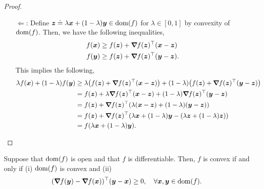 \begin{proof}
\begin{enumerate}
        \item[$\Leftarrow$:] Define $\bm{z} \doteq \lambda \bm{x} + (1-\lambda) \bm{y} \in \mathrm{dom}(f)$ for $\lambda \in[0,1]$ by convexity of $\mathrm{dom}(f)$. Then, we have the following inequalities,
              \begin{align*}
                  f(\bm{x}) & \geq f(\bm{z}) + \bm{\nabla}_{\! } f(\bm{z})^\top (\bm{x}-\bm{z})  \\
                  f(\bm{y}) & \geq f(\bm{z}) + \bm{\nabla}_{\! } f(\bm{z})^\top (\bm{y}-\bm{z}).
              \end{align*}
              This implies the following,
              \begin{align*}
                  \lambda f(\vec{x}) + (1-\lambda) f(\vec{y}) & \geq \lambda \lft( f(\vec{z}) + \transpose{\grad{f(\vec{z})}{}} (\vec{x}-\vec{z}) \rgt) + (1-\lambda) \lft( f(\vec{z}) + \transpose{\grad{f(\vec{z})}{}} (\vec{y}-\vec{z}) \rgt) \\
                                                              & = f(\vec{z}) + \lambda \transpose{\grad{f(\vec{z})}{}} (\vec{x}-\vec{z}) + (1-\lambda) \transpose{\grad{f(\vec{z})}{}} (\vec{y}-\vec{z})                                         \\
                                                              & = f(\vec{z}) + \transpose{\grad{f(\vec{z})}{}} \lft( \lambda (\vec{x}-\vec{z}) + (1-\lambda) (\vec{y}-\vec{z}) \rgt)                                                             \\
                                                              & = f(\vec{z}) + \transpose{\grad{f(\vec{z})}{}} \lft( \lambda \vec{x} + (1-\lambda) \vec{y} - (\lambda \vec{z} + (1-\lambda) \vec{z}) \rgt)                                       \\
                                                              & = f(\lambda \vec{x} + (1-\lambda) \vec{y}).
              \end{align*}
    \end{enumerate}
\end{proof}

\begin{lemma}
    \label{lem:first-order-convexity-alt}

    Suppose that $\mathrm{dom}(f)$ is open and that $f$ is differentiable. Then, $f$ is convex if and only if
    (i) $\mathrm{dom}(f)$ is convex and (ii) \[
        (\bm{\nabla}_{\! } f(\bm{y}) - \bm{\nabla}_{\! } f(\bm{x}))^\top (\bm{y} - \bm{x}) \geq 0, \quad \forall \bm{x}, \bm{y} \in \mathrm{dom}(f).
    \]
\end{lemma}

